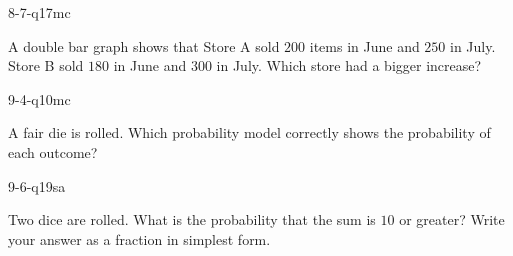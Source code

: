 \begin{practiceQuestion}{8-7-q17}{mc}
\begin{questionText}
A double bar graph shows that Store A sold $200$ items in June and $250$ in July. Store B sold $180$ in June and $300$ in July. Which store had a bigger increase?
\end{questionText}
\end{practiceQuestion}

\begin{practiceQuestion}{9-4-q10}{mc}
\begin{questionText}
A fair die is rolled. Which probability model correctly shows the probability of each outcome?
\end{questionText}
\end{practiceQuestion}

\begin{practiceQuestion}{9-6-q19}{sa}
\begin{questionText}
Two dice are rolled. What is the probability that the sum is $10$ or greater? Write your answer as a fraction in simplest form.
\end{questionText}
\end{practiceQuestion}

